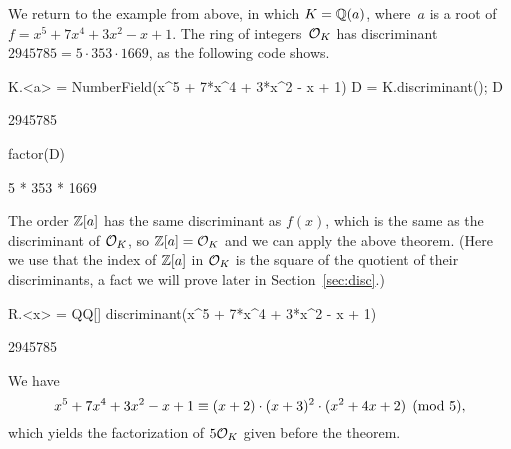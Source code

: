 We return to the example from above, in which $K = \mathbb{Q}(a)$, where~$a$ is
a root of $f = x^5 + 7x^4 + 3x^2 - x + 1$.  The ring of integers~$\mathcal{O}_K$
has discriminant $2945785 = 5\cdot 353\cdot 1669$, as the following
\sage code shows.
\begin{sagecode}
\begin{sagecell}
K.<a> = NumberField(x^5 + 7*x^4 + 3*x^2 - x + 1)
D = K.discriminant(); D
\end{sagecell}
\begin{sageout}
2945785
\end{sageout}
\begin{sagecell}
factor(D)
\end{sagecell}
\begin{sageout}
5 * 353 * 1669
\end{sageout}
\end{sagecode}
The order $\mathbb{Z}[a]$ has the same discriminant as $f(x)$, which
is the same as the discriminant of $\mathcal{O}_K$, so
$\mathbb{Z}[a] = \mathcal{O}_K$ and we can apply the above theorem.
(Here we use that the index of $\mathbb{Z}[a]$ in $\mathcal{O}_K$
is the square of the quotient of their discriminants,
a fact we will prove later in Section~\ref{sec:disc}.)
\begin{sagecode}
\begin{sagecell}
R.<x> = QQ[]
discriminant(x^5 + 7*x^4 + 3*x^2 - x + 1)
\end{sagecell}
\begin{sageout}
2945785
\end{sageout}
\end{sagecode}
We have
$$
	x^5+7x^4+3x^2-x+1 \equiv (x+2)\cdot (x+3)^2 \cdot (x^2+4x+2)\pmod{5},
$$
which yields the factorization of $5\mathcal{O}_K$ given before the theorem.

